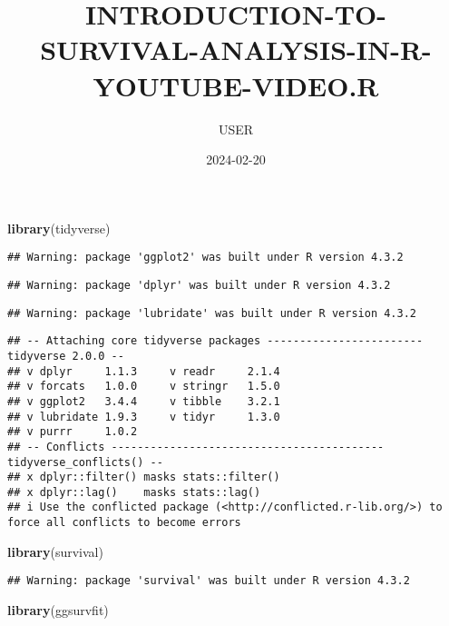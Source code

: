 \documentclass[
]{article}
\title{INTRODUCTION-TO-SURVIVAL-ANALYSIS-IN-R-YOUTUBE-VIDEO.R}
\author{USER}
\date{2024-02-20}
\newenvironment{Shaded}{\begin{snugshade}}{\end{snugshade}}
\newcommand{\FunctionTok}[1]{\textcolor[rgb]{0.13,0.29,0.53}{\textbf{#1}}}
\newcommand{\NormalTok}[1]{#1}
\begin{document}
\maketitle

\begin{Shaded}
\begin{Highlighting}[]
\FunctionTok{library}\NormalTok{(tidyverse)}
\end{Highlighting}
\end{Shaded}

\begin{verbatim}
## Warning: package 'ggplot2' was built under R version 4.3.2
\end{verbatim}

\begin{verbatim}
## Warning: package 'dplyr' was built under R version 4.3.2
\end{verbatim}

\begin{verbatim}
## Warning: package 'lubridate' was built under R version 4.3.2
\end{verbatim}

\begin{verbatim}
## -- Attaching core tidyverse packages ------------------------ tidyverse 2.0.0 --
## v dplyr     1.1.3     v readr     2.1.4
## v forcats   1.0.0     v stringr   1.5.0
## v ggplot2   3.4.4     v tibble    3.2.1
## v lubridate 1.9.3     v tidyr     1.3.0
## v purrr     1.0.2     
## -- Conflicts ------------------------------------------ tidyverse_conflicts() --
## x dplyr::filter() masks stats::filter()
## x dplyr::lag()    masks stats::lag()
## i Use the conflicted package (<http://conflicted.r-lib.org/>) to force all conflicts to become errors
\end{verbatim}

\begin{Shaded}
\begin{Highlighting}[]
\FunctionTok{library}\NormalTok{(survival)}
\end{Highlighting}
\end{Shaded}

\begin{verbatim}
## Warning: package 'survival' was built under R version 4.3.2
\end{verbatim}

\begin{Shaded}
\begin{Highlighting}[]
\FunctionTok{library}\NormalTok{(ggsurvfit)}
\end{Highlighting}
\end{Shaded}
\end{document}

